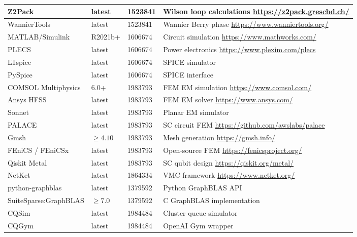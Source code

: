 \documentclass[11pt,a4paper]{article}
\begin{document}
\begin{longtable}{p{4cm} p{2cm} p{3cm} p{4.5cm}}
\midrule
Z2Pack & latest & 1523841 & Wilson loop calculations \newline \url{https://z2pack.greschd.ch/} \\
\midrule
WannierTools & latest & 1523841 & Wannier Berry phase \newline \url{https://www.wanniertools.org/} \\
\midrule
MATLAB/Simulink & R2021b+ & 1606674 & Circuit simulation \newline \url{https://www.mathworks.com/} \\
\midrule
PLECS & latest & 1606674 & Power electronics \newline \url{https://www.plexim.com/plecs} \\
\midrule
LTspice & latest & 1606674 & SPICE simulator \\
\midrule
PySpice & latest & 1606674 & SPICE interface \\
\midrule
COMSOL Multiphysics & 6.0+ & 1983793 & FEM EM simulation \newline \url{https://www.comsol.com/} \\
\midrule
Ansys HFSS & latest & 1983793 & FEM EM solver \newline \url{https://www.ansys.com/} \\
\midrule
Sonnet & latest & 1983793 & Planar EM simulator \\
\midrule
PALACE & latest & 1983793 & SC circuit FEM \newline \url{https://github.com/awslabs/palace} \\
\midrule
Gmsh & $\geq 4.10$ & 1983793 & Mesh generation \newline \url{https://gmsh.info/} \\
\midrule
FEniCS / FEniCSx & latest & 1983793 & Open-source FEM \newline \url{https://fenicsproject.org/} \\
\midrule
Qiskit Metal & latest & 1983793 & SC qubit design \newline \url{https://qiskit.org/metal/} \\
\midrule
NetKet & latest & 1864334 & VMC framework \newline \url{https://www.netket.org/} \\
\midrule
python-graphblas & latest & 1379592 & Python GraphBLAS API \\
\midrule
SuiteSparse:GraphBLAS & $\geq 7.0$ & 1379592 & C GraphBLAS implementation \\
\midrule
CQSim & latest & 1984484 & Cluster queue simulator \\
\midrule
CQGym & latest & 1984484 & OpenAI Gym wrapper \\
\bottomrule
\end{longtable}
\end{document}
